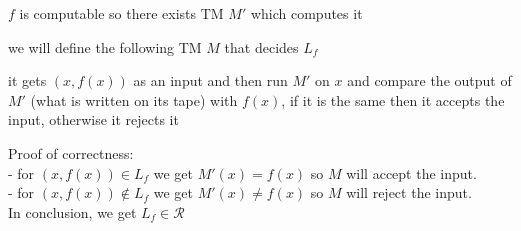 $f$ is computable so there exists TM $M'$ which computes it

we will define the following TM $M$ that decides $L_f$

it gets $(x, f(x))$ as an input and then run $M'$ on $x$ and compare the output of $M'$ (what is written on its tape)
with $f(x)$, if it is the same then it accepts the input, otherwise it rejects it

Proof of correctness: \\
- for $(x, f(x)) \in L_f$ we get $M'(x) = f(x)$ so $M$ will accept the input. \\
- for $(x, f(x)) \notin L_f$ we get $M'(x) \neq f(x)$ so $M$ will reject the input. \\

In conclusion, we get $L_f \in \mathcal{R}$